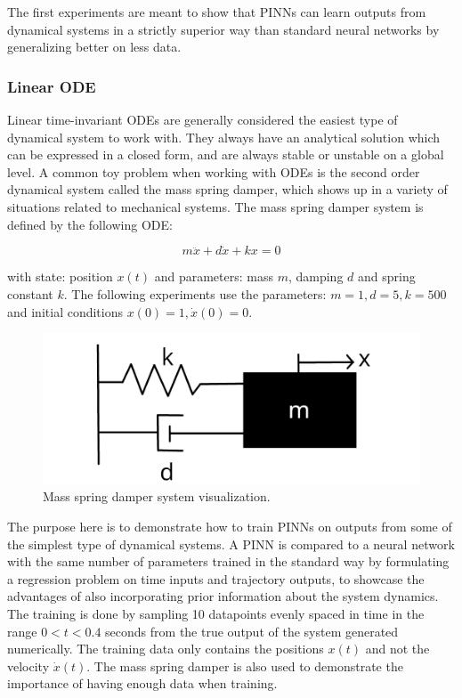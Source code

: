 The first experiments are meant to show that PINNs can learn outputs from dynamical systems in a strictly superior way than standard neural networks by generalizing better on less data.

\subsubsection{Linear ODE}

Linear time-invariant ODEs are generally considered the easiest type of dynamical system to work with. They always have an analytical solution which can be expressed in a closed form, and are always stable or unstable on a global level. A common toy problem when working with ODEs is the second order dynamical system called the mass spring damper, which shows up in a variety of situations related to mechanical systems. The mass spring damper system is defined by the following ODE:

\begin{equation}
    m \ddot{x} + d \dot{x} + k x = 0
    \label{eq:msd}
\end{equation}

\noindent with state: position $x(t)$ and parameters: mass $m$, damping $d$ and spring constant $k$. The following experiments use the parameters: $m = 1, d = 5, k = 500$ and initial conditions $x(0) = 1, \dot{x}(0) = 0$.

\begin{figure}[H]
    \centering
    \includegraphics[width=0.8\linewidth]{Figures/Misc/massspringdamper.png}
    \caption{Mass spring damper system visualization.}
    \label{fig:massspringdamper}
\end{figure}

The purpose here is to demonstrate how to train PINNs on outputs from some of the simplest type of dynamical systems. A PINN is compared to a neural network with the same number of parameters trained in the standard way by formulating a regression problem on time inputs and trajectory outputs, to showcase the advantages of also incorporating prior information about the system dynamics. The training is done by sampling 10 datapoints evenly spaced in time in the range $0 < t < 0.4$ seconds from the true output of the system generated numerically. The training data only contains the positions $x(t)$ and not the velocity $\dot{x}(t)$. The mass spring damper is also used to demonstrate the importance of having enough data when training.

